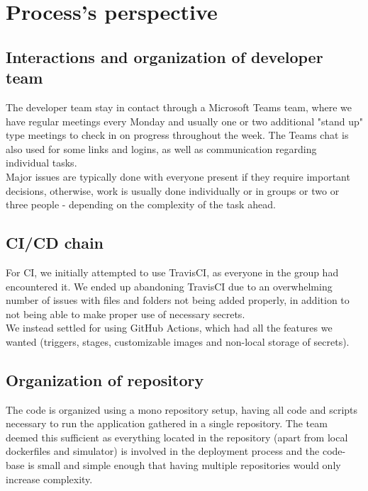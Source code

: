 \section{Process's perspective} \label{section:Process perspective}

\subsection{Interactions and organization of developer team} %
The developer team stay in contact through a Microsoft Teams team, where we have regular meetings every Monday and usually one or two additional "stand up" type meetings to check in on progress throughout the week. The Teams chat is also used for some links and logins, as well as communication regarding individual tasks. \\ \indent Major issues are typically done with everyone present if they require important decisions, otherwise, work is usually done individually or in groups or two or three people - depending on the complexity of the task ahead.
 

\subsection{CI/CD chain} %
For CI, we initially attempted to use TravisCI, as everyone in the group had encountered it. We ended up abandoning TravisCI due to an overwhelming number of issues with files and folders not being added properly, in addition to not being able to make proper use of necessary secrets. \\ \indent We instead settled for using GitHub Actions, which had all the features we wanted (triggers, stages, customizable images and non-local storage of secrets).

\subsection{Organization of repository}
The code is organized using a mono repository setup, having all code and scripts necessary to run the application gathered in a single repository. The team deemed this sufficient as everything located in the repository (apart from local dockerfiles and simulator) is involved in the deployment process and the code-base is small and simple enough that having multiple repositories would only increase complexity. 

